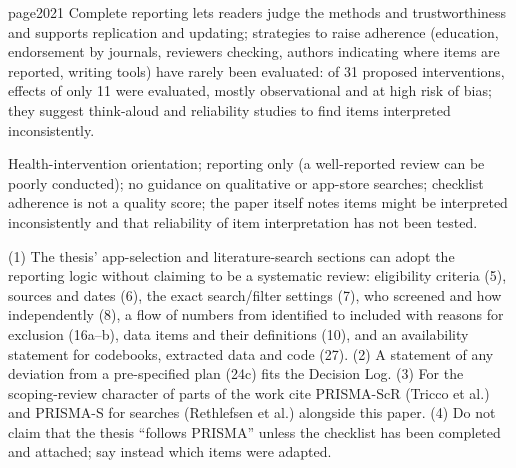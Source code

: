 \begin{papercard}{page2021}
 Complete reporting lets readers judge the methods and trustworthiness and supports replication and updating; strategies to raise adherence (education, endorsement by journals, reviewers checking, authors indicating where items are reported, writing tools) have rarely been evaluated: of 31 proposed interventions, effects of only 11 were evaluated, mostly observational and at high risk of bias; they suggest think-aloud and reliability studies to find items interpreted inconsistently.

 Health-intervention orientation; reporting only (a well-reported review can be poorly conducted); no guidance on qualitative or app-store searches; checklist adherence is not a quality score; the paper itself notes items might be interpreted inconsistently and that reliability of item interpretation has not been tested.

 (1) The thesis' app-selection and literature-search sections can adopt the reporting logic without claiming to be a systematic review: eligibility criteria (5), sources and dates (6), the exact search/filter settings (7), who screened and how independently (8), a flow of numbers from identified to included with reasons for exclusion (16a--b), data items and their definitions (10), and an availability statement for codebooks, extracted data and code (27). (2) A statement of any deviation from a pre-specified plan (24c) fits the Decision Log. (3) For the scoping-review character of parts of the work cite PRISMA-ScR (Tricco et al.) and PRISMA-S for searches (Rethlefsen et al.) alongside this paper. (4) Do not claim that the thesis ``follows PRISMA'' unless the checklist has been completed and attached; say instead which items were adapted.
\end{papercard}

